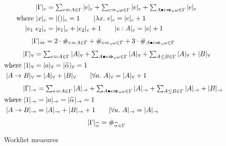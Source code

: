 \begin{figure}[t]
\hfill {} \hfill  {}
\begin{gather*}
\begin{aligned}
|\Gm|_e &= \textstyle\sum_{e\Lto A\in\Gm}|e|_e + \sum_{e\To_a \jg\in\Gm}|e|_e +
    \sum_{\appInfAlg{A}{e}\in\Gm}|e|_e\\
\text{where } |x|_e &= |()|_e = 1 \qquad |\lam e|_e = |e|_e + 1\\
|e_1~e_2|_e &= |e_1|_e + |e_2|_e + 1 \qquad |e:A|_e = |e| + 1
\end{aligned}
\end{gather*}
\hfill \framebox{$|\Gm|_\Leftrightarrow$} \hfill  {}
\begin{gather*}
\begin{aligned}
|\Gm|_\Leftrightarrow &= 2\cdot\#_{e\Lto A\in\Gm} +
    \#_{e\To_a \jg\in\Gm} + 3\cdot\#_{\appInfAlg{A}{e}\in\Gm}
\end{aligned}
\end{gather*}
\hfill \framebox{$|\Gm|_\forall$} \hfill  {}
\begin{gather*}
\begin{aligned}
|\Gm|_\forall &= \textstyle\sum_{e\Lto A\in\Gm}|A|_\forall + \sum_{\appInfAlg{A}{e}\in\Gm}|A|_\forall +
    \sum_{A\le B\in\Gm} |A|_\forall + |B|_\forall\\
\text{where } |1|_\forall &= |a|_\forall = |\al|_\forall = 1\\
|A\to B|_\forall &= |A|_\forall + |B|_\forall \qquad |\all A|_\forall = |A|_\forall + 1
\end{aligned}
\end{gather*}
\hfill \framebox{$|\Gm|_\to$} \hfill  {}
\begin{gather*}
\begin{aligned}
|\Gm|_\to &= \textstyle\sum_{e\Lto A\in\Gm}|A|_\to + \sum_{\appInfAlg{A}{e}\in\Gm}|A|_\to +
    \sum_{A\le B\in\Gm} |A|_\to + |B|_\to\\
\text{where } |1|_\to &= |a|_\to = |\al|_\to = 1\\
|A\to B|_\to &= |A|_\to + |B|_\to + 1 \qquad |\all A|_\to = |A|_\to
\end{aligned}
\end{gather*}
\hfill \framebox{$|\Gm|_{\al}$} \hfill  {}
\begin{gather*}
\begin{aligned}
|\Gm|_{\al} &= \#_{\al\in\Gm}\\
\end{aligned}
\end{gather*}
\caption{Worklist measures}
\label{fig:measures}
\end{figure}

